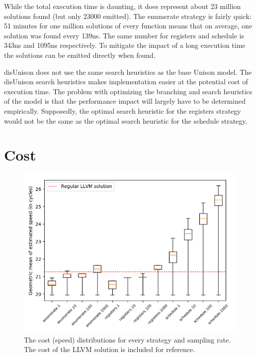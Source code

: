 While the total execution time is daunting, it does represent about 23 million solutions
found (but only 23000 emitted). The enumerate strategy is fairly quick: 51 minutes for one
million solutions of every function means that on average, one solution was found every
139ns. The same number for registers and schedule is 343ns and 1095ns respectively. To
mitigate the impact of a long execution time the solutions can be emitted directly when
found.

disUnison does not use the same search heuristics as the base Unison model. The disUnison
search heuristics makes implementation easier at the potential cost of execution time. The
problem with optimizing the branching and search heuristics of the model is that the
performance impact will largely have to be determined empirically. Supposedly, the optimal
search heuristic for the registers strategy would not be the same as the optimal search
heuristic for the schedule strategy.

\section{Cost}
\label{sec:cost_result}

\begin{figure}[h]
	\centering
	\includegraphics[width=\textwidth,height=0.5\textheight]{results/figures/cost_speed}
	\caption{The cost (speed) distributions for every strategy and sampling rate. The cost of the LLVM solution is included for reference.}
	\label{fig:cost-speed}
\end{figure}

